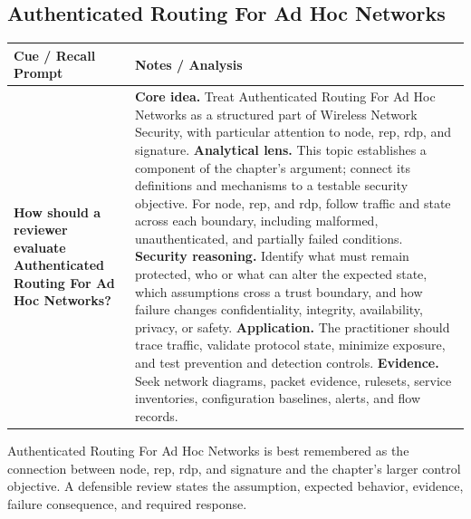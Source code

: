 \documentclass[11pt]{article}
\newcommand{\CornellHeader}{%
\rowcolor{Navy}\color{white}\bfseries Cue / Recall Prompt & \color{white}\bfseries Notes / Analysis\\\hline}
\newcommand{\CornellRow}[2]{%
\cellcolor{CueGray}\RaggedRight\textbf{#1} & \RaggedRight #2\\\hline}
\begin{document}
\subsection*{Authenticated Routing For Ad Hoc Networks}
\begin{longtable}{>{\RaggedRight\arraybackslash}p{}|>{\RaggedRight\arraybackslash}p{}}
\CornellHeader
\CornellRow{How should a reviewer evaluate Authenticated Routing For Ad Hoc Networks?}{\textbf{Core idea.} Treat Authenticated Routing For Ad Hoc Networks as a structured part of Wireless Network Security, with particular attention to node, rep, rdp, and signature. \textbf{Analytical lens.} This topic establishes a component of the chapter's argument; connect its definitions and mechanisms to a testable security objective. For node, rep, and rdp, follow traffic and state across each boundary, including malformed, unauthenticated, and partially failed conditions. \textbf{Security reasoning.} Identify what must remain protected, who or what can alter the expected state, which assumptions cross a trust boundary, and how failure changes confidentiality, integrity, availability, privacy, or safety. \textbf{Application.} The practitioner should trace traffic, validate protocol state, minimize exposure, and test prevention and detection controls. \textbf{Evidence.} Seek network diagrams, packet evidence, rulesets, service inventories, configuration baselines, alerts, and flow records.}
\end{longtable}
\begin{topicsummary}
Authenticated Routing For Ad Hoc Networks is best remembered as the connection between node, rep, rdp, and signature and the chapter's larger control objective. A defensible review states the assumption, expected behavior, evidence, failure consequence, and required response.
\end{topicsummary}
\end{document}
